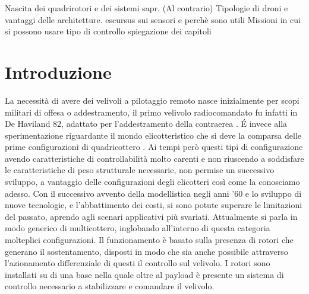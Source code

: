 \begin{scaletta}
	Nascita dei quadrirotori e dei sistemi sapr. (Al contrario)
	Tipologie di droni e vantaggi delle architetture. escursus sui sensori e perchè sono utili
	Missioni in cui si possono usare
	tipo di controllo
	spiegazione dei capitoli
\end{scaletta}
\chapter{Introduzione}
La necessità di avere dei velivoli a pilotaggio remoto nasce inizialmente per scopi militari di offesa o addestramento, il primo velivolo radiocomandato fu infatti in De Haviland 82, adattato per l'addestramento della contraerea \cite{histoDrone}. \'E invece alla sperimentazione riguardante il mondo elicotteristico che si deve la comparsa delle prime configurazioni di quadricottero \cite{Young}. Ai tempi però questi tipi di configurazione avendo caratteristiche di controllabilità molto carenti e non riuscendo a soddisfare le caratteristiche di peso strutturale necessarie, non permise un successivo sviluppo, a vantaggio delle configurazioni degli elicotteri così come la conosciamo adesso. Con il successivo avvento della modellistica negli anni '60 e lo sviluppo di nuove tecnologie, e l'abbattimento dei costi, si sono potute superare le limitazioni del passato, aprendo agli scenari applicativi più svariati. 
Attualmente si parla in modo generico di multicottero, inglobando all'interno di questa categoria molteplici configurazioni. Il funzionamento è basato sulla presenza di rotori che generano il sostentamento, disposti in modo che sia anche possibile attraverso l'azionamento differenziale di questi il controllo sul velivolo. I rotori sono installati su di una base nella quale oltre al payload è presente un sistema di controllo necessario a stabilizzare e comandare il velivolo. 